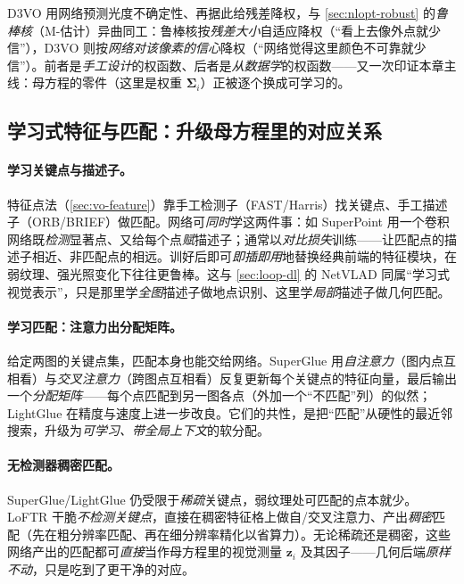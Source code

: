 \begin{insight}[降权非朗伯面 $=$ 学习式鲁棒核]
D3VO 用网络预测光度不确定性、再据此给残差降权，与 \cref{sec:nlopt-robust} 的\emph{鲁棒核}（M-估计）异曲同工：鲁棒核按\emph{残差大小}自适应降权（“看上去像外点就少信”），D3VO 则按\emph{网络对该像素的信心}降权（“网络觉得这里颜色不可靠就少信”）。前者是\emph{手工设计}的权函数、后者是\emph{从数据学}的权函数——又一次印证本章主线：母方程的零件（这里是权重 $\boldsymbol\Sigma_i$）正被逐个换成可学习的。
\end{insight}

\subsection{学习式特征与匹配：升级母方程里的对应关系}
\label{sec:learning-feature}

\paragraph{学习关键点与描述子。}
特征点法（\cref{sec:vo-feature}）靠手工检测子（FAST/Harris）找关键点、手工描述子（ORB/BRIEF）做匹配。网络可\emph{同时}学这两件事：如 SuperPoint\cite{detone2018superpoint} 用一个卷积网络既\emph{检测}显著点、又给每个点\emph{赋}描述子；通常以\emph{对比损失}训练——让匹配点的描述子相近、非匹配点的相远。训好后即可\emph{即插即用}地替换经典前端的特征模块，在弱纹理、强光照变化下往往更鲁棒。这与 \cref{sec:loop-dl} 的 NetVLAD 同属“学习式视觉表示”，只是那里学\emph{全图}描述子做地点识别、这里学\emph{局部}描述子做几何匹配。

\paragraph{学习匹配：注意力出分配矩阵。}
给定两图的关键点集，匹配本身也能交给网络。SuperGlue\cite{sarlin2020superglue} 用\emph{自注意力}（图内点互相看）与\emph{交叉注意力}（跨图点互相看）反复更新每个关键点的特征向量，最后输出一个\emph{分配矩阵}——每个点匹配到另一图各点（外加一个“不匹配”列）的似然；LightGlue\cite{lindenberger2023lightglue} 在精度与速度上进一步改良。它们的共性，是把“匹配”从硬性的最近邻搜索，升级为\emph{可学习、带全局上下文}的软分配。

\paragraph{无检测器稠密匹配。}
SuperGlue/LightGlue 仍受限于\emph{稀疏}关键点，弱纹理处可匹配的点本就少。LoFTR\cite{sun2021loftr} 干脆\emph{不检测关键点}，直接在稠密特征格上做自/交叉注意力、产出\emph{稠密}匹配（先在粗分辨率匹配、再在细分辨率精化以省算力）。无论稀疏还是稠密，这些网络产出的匹配都可\emph{直接}当作母方程里的视觉测量 $\mathbf{z}_i$ 及其因子——几何后端\emph{原样不动}，只是吃到了更干净的对应。

